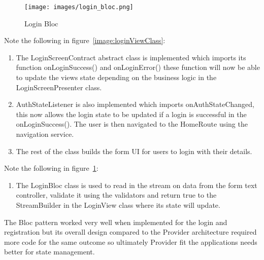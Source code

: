 \begin{figure}[h!]
    \caption{Login Bloc}
    \label{image:loginBloc}
    \centering
    \texttt{[image: images/login\_bloc.png]}
\end{figure}

Note the following in figure~\ref{image:loginViewClass}:
\begin{enumerate}
    \item The LoginScreenContract abstract class is implemented which imports its function onLoginSuccess() and onLoginError() these function will now be able to update the views state depending on the business logic in the LoginScreenPresenter class.
    \item AuthStateListener is also implemented which imports onAuthStateChanged, this now allows the login state to be updated if a login is successful in the onLoginSuccess(). The user is then navigated to the HomeRoute using the navigation service.
    \item The rest of the class builds the form UI for users to login with their details.
\end{enumerate}

Note the following in figure~\ref{image:loginBloc}:
\begin{enumerate}
    \item The LoginBloc class is used to read in the stream on data from the form text controller, validate it using the validators and return true to the StreamBuilder in the LoginView class where its state will update.
\end{enumerate}
The Bloc pattern worked very well when implemented for the login and registration but its overall design compared to the Provider architecture required more code for the same outcome so ultimately Provider fit the applications needs better for state management.

